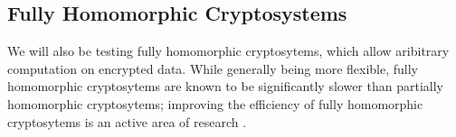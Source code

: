 


\subsection{Fully Homomorphic Cryptosystems}
We will also be testing fully homomorphic cryptosytems, which allow aribitrary computation on encrypted data.
While generally being more flexible, fully homomorphic cryptosytems are known to be significantly slower than partially homomorphic cryptosytems; improving the efficiency of fully homomorphic cryptosytems is an active area of research \cite{sen_homomorphic_2013}.

